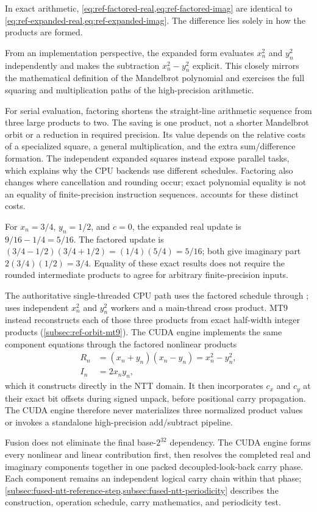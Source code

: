 In exact arithmetic, \cref{eq:ref-factored-real,eq:ref-factored-imag} are
identical to \cref{eq:ref-expanded-real,eq:ref-expanded-imag}. The difference
lies solely in how the products are formed.

From an implementation perspective, the expanded form evaluates
$x_n^2$ and $y_n^2$ independently and makes the subtraction
$x_n^2 - y_n^2$ explicit. This closely mirrors the mathematical definition
of the Mandelbrot polynomial and exercises the full squaring and
multiplication paths of the high-precision arithmetic.

For serial evaluation, factoring shortens the straight-line arithmetic sequence
from three large products to two. The saving is one product, not a shorter
Mandelbrot orbit or a reduction in required precision. Its value depends on
the relative costs of a specialized square, a general multiplication, and the
extra sum/difference formation. The independent expanded squares instead
expose parallel tasks, which explains why the CPU backends use different
schedules. Factoring also changes where cancellation and rounding occur;
exact polynomial equality is not an equality of finite-precision instruction
sequences.  accounts for these distinct costs.

For $x_n=3/4$, $y_n=1/2$, and $c=0$, the expanded real update is
$9/16-1/4=5/16$.  The factored update is
$(3/4-1/2)(3/4+1/2)=(1/4)(5/4)=5/16$; both give imaginary part
$2(3/4)(1/2)=3/4$.  Equality of these exact results does not require the
rounded intermediate products to agree for arbitrary finite-precision inputs.

The authoritative single-threaded CPU path uses the factored schedule through
;  uses independent $x_n^2$ and
$y_n^2$ workers and a main-thread cross product. MT9 instead reconstructs
each of those three products from exact half-width integer products
(\cref{subsec:ref-orbit-mt9}). The CUDA engine
implements the same component equations through the factored nonlinear products
\begin{align}
R_n &= (x_n+y_n)(x_n-y_n)=x_n^2-y_n^2, \\
I_n &= 2x_ny_n,
\end{align}
which it constructs directly in the NTT domain.  It then incorporates $c_x$ and
$c_y$ at their exact bit offsets during signed unpack, before positional carry
propagation.  The CUDA engine therefore never materializes three normalized
product values or invokes a standalone high-precision add/subtract pipeline.

Fusion does not eliminate the final base-$2^{32}$ dependency.  The CUDA engine forms every
nonlinear and linear contribution first, then resolves the completed real and
imaginary components together in one packed decoupled-look-back carry phase.
Each component remains an independent logical carry chain within that phase;
\cref{subsec:fused-ntt-reference-step,subsec:fused-ntt-periodicity} describes
the construction, operation schedule, carry mathematics, and periodicity test.
